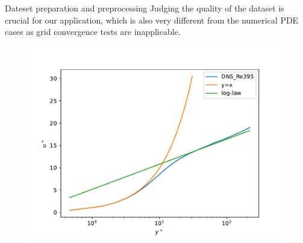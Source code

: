 \documentclass[paper slide]{beamer}
\begin{document}

 
\begin{frame}{Dateset preparation and preprocessing}
	Judging the quality of the dataset is crucial for our application, which is also very different from
	the numerical PDE cases as grid convergence tests are inapplicable.
	\begin{figure}
        \includegraphics[width=0.7\linewidth]{fig/velocity_profile.pdf}
    \end{figure}    
\end{frame}
\end{document}
